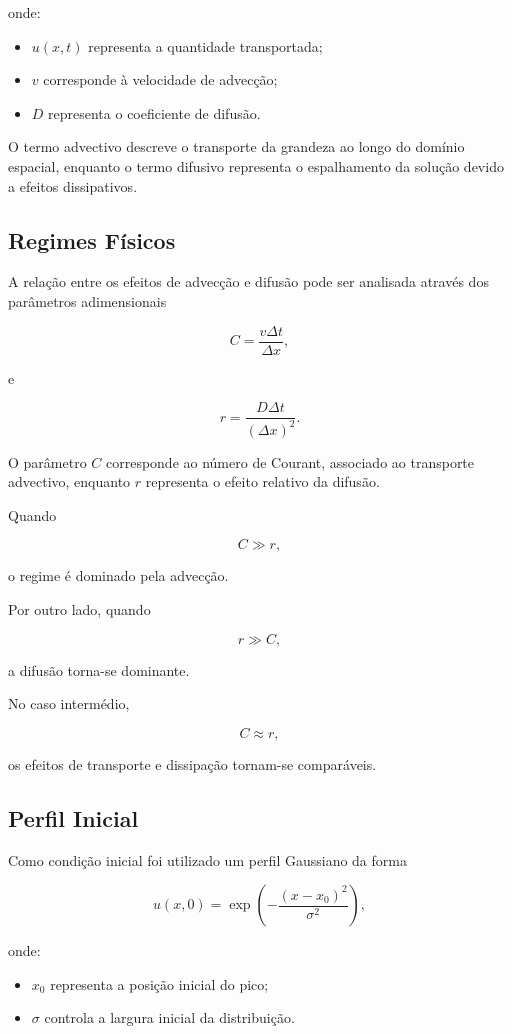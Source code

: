 \documentclass{article}
\begin{document}
onde:

\begin{itemize}
    \item $u(x,t)$ representa a quantidade transportada;
    \item $v$ corresponde à velocidade de advecção;
    \item $D$ representa o coeficiente de difusão.
\end{itemize}

O termo advectivo descreve o transporte da grandeza ao longo do domínio espacial, enquanto o termo difusivo representa o espalhamento da solução devido a efeitos dissipativos.

\subsection{Regimes Físicos}

A relação entre os efeitos de advecção e difusão pode ser analisada através dos parâmetros adimensionais

\[
C
=
\frac{v\Delta t}{\Delta x},
\]

e

\[
r
=
\frac{D\Delta t}{(\Delta x)^2}.
\]

O parâmetro $C$ corresponde ao número de Courant, associado ao transporte advectivo, enquanto $r$ representa o efeito relativo da difusão.

Quando

\[
C \gg r,
\]

o regime é dominado pela advecção.

Por outro lado, quando

\[
r \gg C,
\]

a difusão torna-se dominante.

No caso intermédio,

\[
C \approx r,
\]

os efeitos de transporte e dissipação tornam-se comparáveis.

\subsection{Perfil Inicial}

Como condição inicial foi utilizado um perfil Gaussiano da forma

\[
u(x,0)
=
\exp
\left(
-\frac{(x-x_0)^2}{\sigma^2}
\right),
\]

onde:

\begin{itemize}
    \item $x_0$ representa a posição inicial do pico;
    \item $\sigma$ controla a largura inicial da distribuição.
\end{itemize}
\end{document}
